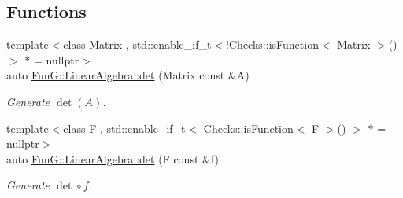 \subsection*{\-Functions}
\begin{DoxyCompactItemize}
\item 
{\footnotesize template$<$class Matrix , std\-::enable\-\_\-if\-\_\-t$<$!\-Checks\-::is\-Function$<$ Matrix $>$()$>$ $\ast$  = nullptr$>$ }\\auto \hyperlink{group__LinearAlgebraGroup_gadb3017b4b2828e25a0784b10396a836f}{\-Fun\-G\-::\-Linear\-Algebra\-::det} (\-Matrix const \&\-A)
\begin{DoxyCompactList}\small\item\em \-Generate $\det(A)$. \end{DoxyCompactList}\item 
{\footnotesize template$<$class F , std\-::enable\-\_\-if\-\_\-t$<$ Checks\-::is\-Function$<$ F $>$() $>$ $\ast$  = nullptr$>$ }\\auto \hyperlink{group__LinearAlgebraGroup_ga552048de67f3412ae0a220b3123db6e5}{\-Fun\-G\-::\-Linear\-Algebra\-::det} (\-F const \&f)
\begin{DoxyCompactList}\small\item\em \-Generate $\det\circ f$. \end{DoxyCompactList}\end{DoxyCompactItemize}
